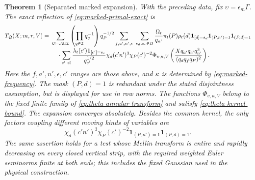 \documentclass[11pt,a4paper]{article}
\numberwithin{equation}{section}
\newtheorem{theorem}{Theorem}[section]
\theoremstyle{definition}
\theoremstyle{remark}
\newcommand{\ind}{\mathbf 1}
\begin{document}
\begin{theorem}[Separated marked expansion]\label{thm:marked-expansion}
With the preceding data, fix $\upsilon=\epsilon_m\Gamma$.
The exact reflection of \eqref{eq:marked-primal-exact} is
\begin{align}\label{eq:marked-reflection-exact}
 T_{\mathcal Q}(X;m,r,V)
 ={}&\sum_{\mathcal Q=\mathcal A\sqcup\mathcal I}
       \left(\prod_{q\in\mathcal I}q_q^{-1}\right)q_P^{-1/2}
       \sum_{f,a',n',\epsilon}\ \sum_{s_d,s_c\in B}
       \frac{\Omega_t}{q_{n'}}\pi_t(P)\rho_t(d)
       \ind_{[d]=s_d}\ind_{(P,n')=1}\ind_{(P,d)=1}
       \notag\\[-2pt]
 &\hspace{4mm}\cdot\sum_{c'\ \mathrm{sf}}
       \frac{\lambda_t(c')\ind_{[c']=s_c}}{q_{c'}^{1/2}}
       \chi_d(c'n')^3\chi_P(c')^{-2}
       \Phi_{\upsilon,\kappa,V}
           \left(\frac{Xq_{a'}q_{c'}q_{n'}^3}{(q_dq_fq_P)^2}\right).
\end{align}
Here the $f,a',n',\epsilon,c'$ ranges are those above, and $\kappa$
is determined by \eqref{eq:marked-frequency}.  The mask $(P,d)=1$ is redundant under the stated
disjointness assumption, but is displayed for use in row norms.
The functions $\Phi_{\upsilon,\kappa,V}$ belong to the fixed finite
family of \eqref{eq:theta-annular-transform} and satisfy
\eqref{eq:theta-kernel-bound}.  The expansion converges absolutely.
Besides the common kernel, the only factors coupling different moving
kinds of variables are
\begin{equation}\label{eq:marked-only-couplings}
 \chi_d(c'n')^3\chi_P(c')^{-2}
       \ind_{(P,n')=1}\ind_{(P,d)=1}.
\end{equation}
The same assertion holds for a test whose Mellin transform is entire
and rapidly decreasing on every closed vertical strip, with the
required weighted Euler seminorms finite at both ends; this includes the fixed
Gaussian used in the physical construction.
\end{theorem}
\end{document}
